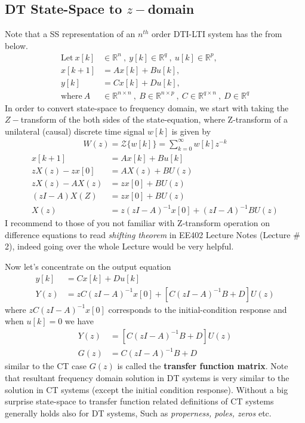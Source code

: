 \documentclass[twoside]{article}
\begin{document}
\subsection{DT State-Space to $z-$domain}

Note that a SS representation of an $n^{th}$ order DTI-LTI system has the from below.
%
\begin{align*}
  \mathrm{Let} \ x[k] &\in \mathbb{R}^n \ , \ y[k] \in \mathbb{R}^q \ ,\  u[k] \in
  \mathbb{R}^p , \\
  x[k+1] &= A x[k] + B u[k] , \\
  y[k] &= C x[k] + D u[k] , \\
  \mathrm{where} \ A &\in \mathbb{R}^{n \times n} \ , \ 
    B \in \mathbb{R}^{n \times p} \ ,\  C \in \mathbb{R}^{q \times n} \ , \ D \in \mathbb{R}^q
\end{align*}
%
In order to convert state-space to frequency domain, we start with taking the $Z-$transform of the 
both sides of the state-equation, where Z-transform of a unilateral (causal) discrete time signal $w[k]$ is given by 
%
\begin{align*}
  W(z) = \mathcal{Z} \lbrace w[k] \rbrace = \sum\limits_{k=0}^{\infty} w[k] z^{-k} 
\end{align*}
%
\begin{align*}
x[k+1] &= A x[k] + B u[k]
\\
z X(z) - z x[0] &= A X(z) + B U(z)
\\
z X(z) - A X(z) &= z x[0] +  B U(z)
\\
\left( z I - A \right) X(Z) &=  z x[0] +  B U(z)
\\
X(z) &= z \left( z I - A \right)^{-1} x[0] + \left( z I - A \right)^{-1} B U(z)
\end{align*}
%
I recommend to those of you not familiar with Z-transform operation on
difference equations to read \textit{shifting theorem} in EE402 Lecture Notes (Lecture
\# 2), indeed going over the whole Lecture would be very helpful. 

Now let's concentrate on the output equation
%
\begin{align*}
y[k] &= C x[k] + D u[k]
\\
Y(z) &= z C  \left( z I - A \right)^{-1} x[0] + \left[ C \left( z I - A \right)^{-1} B + D \right] U(z)
\end{align*}
%
where $z C  \left( z I - A \right)^{-1} x[0]$ corresponds to the initial-condition response and 
when $u[k]=0$ we have
%
\begin{align*}
Y(z) &=  \left[ C \left( z I - A \right)^{-1} B + D \right] U(z)
\\
G(z) &= C \left( z I - A \right)^{-1} B + D
\end{align*}
%
similar to the CT case $G(z)$ is called the \textbf{transfer function
  matrix}. Note that resultant frequency domain solution in DT systems
is very similar to the solution in CT systems (except the initial
condition response). Without a big surprise state-space to transfer function related
definitions of CT systems generally holds also for DT systems, Such as \textit{properness, poles,
  zeros} etc.
\end{document}
